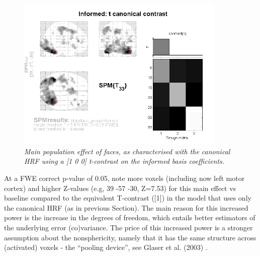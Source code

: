 \begin{figure}
\begin{center}
\includegraphics[width=100mm]{faces_group/informed_t}
\caption{\em Main population effect of faces, as characterised with the canonical HRF using a [1 0 0] t-contrast on the informed basis coefficients. \label{informed_t}}
\end{center}
\end{figure}
At a FWE correct p-value of 0.05, note more voxels (including now left motor cortex) and higher Z-values (e.g, 39 -57 -30, Z=7.53) for this main effect vs baseline compared to the equivalent T-contrast ([1]) in the model that uses only the canonical HRF (as in previous Section). 
The main reason for this increased power is the increase in the degrees of freedom, which entails better estimators of the underlying error (co)variance. The price of this increased power is a stronger assumption about the nonsphericity, namely that it has the same structure across (activated) voxels - the ``pooling device'', see Glaser et al. (2003) \cite{daniel_hbf2}.

